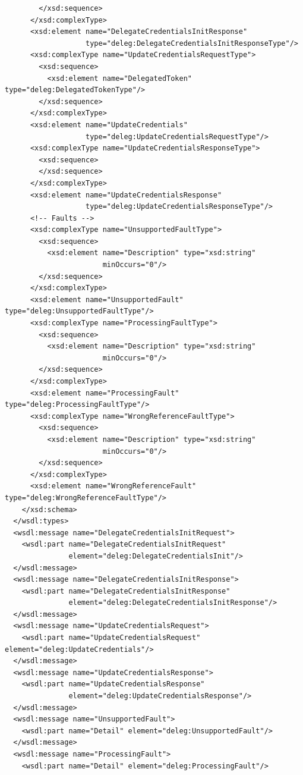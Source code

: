 \documentclass{article}                            %
\begin{document}
\begin{footnotesize}
\begin{verbatim}
        </xsd:sequence>
      </xsd:complexType>
      <xsd:element name="DelegateCredentialsInitResponse"
                   type="deleg:DelegateCredentialsInitResponseType"/>
      <xsd:complexType name="UpdateCredentialsRequestType">
        <xsd:sequence>
          <xsd:element name="DelegatedToken" type="deleg:DelegatedTokenType"/>
        </xsd:sequence>
      </xsd:complexType>
      <xsd:element name="UpdateCredentials"
                   type="deleg:UpdateCredentialsRequestType"/>
      <xsd:complexType name="UpdateCredentialsResponseType">
        <xsd:sequence>
        </xsd:sequence>
      </xsd:complexType>
      <xsd:element name="UpdateCredentialsResponse"
                   type="deleg:UpdateCredentialsResponseType"/>
      <!-- Faults -->
      <xsd:complexType name="UnsupportedFaultType">
        <xsd:sequence>
          <xsd:element name="Description" type="xsd:string"
                       minOccurs="0"/>
        </xsd:sequence>
      </xsd:complexType>
      <xsd:element name="UnsupportedFault" type="deleg:UnsupportedFaultType"/>
      <xsd:complexType name="ProcessingFaultType">
        <xsd:sequence>
          <xsd:element name="Description" type="xsd:string"
                       minOccurs="0"/>
        </xsd:sequence>
      </xsd:complexType>
      <xsd:element name="ProcessingFault" type="deleg:ProcessingFaultType"/>
      <xsd:complexType name="WrongReferenceFaultType">
        <xsd:sequence>
          <xsd:element name="Description" type="xsd:string"
                       minOccurs="0"/>
        </xsd:sequence>
      </xsd:complexType>
      <xsd:element name="WrongReferenceFault" type="deleg:WrongReferenceFaultType"/>
    </xsd:schema>
  </wsdl:types>
  <wsdl:message name="DelegateCredentialsInitRequest">
    <wsdl:part name="DelegateCredentialsInitRequest"
               element="deleg:DelegateCredentialsInit"/>
  </wsdl:message>
  <wsdl:message name="DelegateCredentialsInitResponse">
    <wsdl:part name="DelegateCredentialsInitResponse"
               element="deleg:DelegateCredentialsInitResponse"/>
  </wsdl:message>
  <wsdl:message name="UpdateCredentialsRequest">
    <wsdl:part name="UpdateCredentialsRequest" element="deleg:UpdateCredentials"/>
  </wsdl:message>
  <wsdl:message name="UpdateCredentialsResponse">
    <wsdl:part name="UpdateCredentialsResponse"
               element="deleg:UpdateCredentialsResponse"/>
  </wsdl:message>
  <wsdl:message name="UnsupportedFault">
    <wsdl:part name="Detail" element="deleg:UnsupportedFault"/>
  </wsdl:message>
  <wsdl:message name="ProcessingFault">
    <wsdl:part name="Detail" element="deleg:ProcessingFault"/>

\end{verbatim}
\end{footnotesize}
\end{document}

